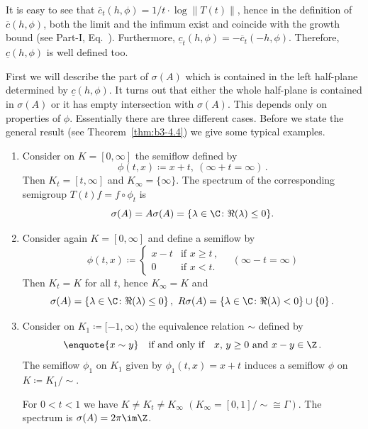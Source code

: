 It is easy to see that $\overline{c}_{t}(h,\phi) = 1/t\cdot\log\|T(t)\|$, hence in the definition of\/ $\overline{c}(h,\phi)$, both the limit and the infimum exist and coincide with the growth bound (see Part-I, Eq.~).
Furthermore, $\underline{c}_{t}(h,\phi) = -\overline{c}_{t}(-h,\phi)$.
Therefore, $\underline{c}(h,\phi)$ is well defined too.

First we will describe the part of\/ $\sigma(A)$ which is contained in the left half-plane determined by $\underline{c}(h,\phi)$.
It turns out that either the whole half-plane is contained in $\sigma(A)$ or it has empty intersection with $\sigma(A)$.
This depends only on properties of\/ $\phi$.
Essentially there 
are three different cases. 
Before we state the general result (see Theorem~\ref{thm:b3-4.4}) we give some typical examples.
\begin{examples}\label{ex:b3-4.3}
	\begin{enumerate}[\upshape (i), wide, labelindent=.25em]
	\item 
	Consider on $K = [0,\infty]$ the semiflow defined by 
    \[
    \phi(t,x) \coloneq x + t,\ (\infty + t = \infty)\,.
    \]
	Then $K_{t} = [t,\infty]$ and $K_{\infty} = \{\infty\}$.
	The spectrum of the corresponding semigroup $T(t)f = f\circ\phi_{t}$ is 
    \[
    \sigma(A) = A\sigma(A) = 
    \{\lambda \in \C \colon \Re(\lambda) \leq 0\} .
    \]
	
	\item 
	Consider again $K = [0,\infty]$ and define a semiflow by
	\[
	\phi(t,x) \coloneq \begin{cases} 
		x - t & \text{if } x \geq t \,,\\
		0 & \text{if } x < t .
	\end{cases} \quad (\infty - t = \infty)
	\]
	Then $K_{t} = K$ for all $t$, hence $K_{\infty} = K$ and \[
    \sigma(A) = \{\lambda \in \C \colon \Re(\lambda) \leq 0\}\,, \ R\sigma(A) = \{\lambda \in \C \colon \Re(\lambda) < 0\} \cup \{0\}\,.
    \]
	
	\item 
	Consider on $K_{1} \coloneq [-1,\infty)$ the equivalence relation $\sim$ defined by 
    \[
    \enquote{x \sim y} \quad\text{if and only if}\quad x,\,y \geq 0 \text{ and } x - y \in \Z\,.
    \]
	The semiflow $\phi_{1}$ on $K_{1}$ given by $\phi_{1}(t,x) = x + t$ induces a semiflow $\phi$ on $K \coloneq K_{1}/{\sim}$.
    
	For $0 < t < 1$ we have $K \neq K_{t} \neq K_{\infty}$ $(K_{\infty} = [0,1]/{\sim} \cong \Gamma)$.
	The spectrum is $\sigma(A) = 2\pi \im\Z$.
	

\end{enumerate}
\end{examples}
